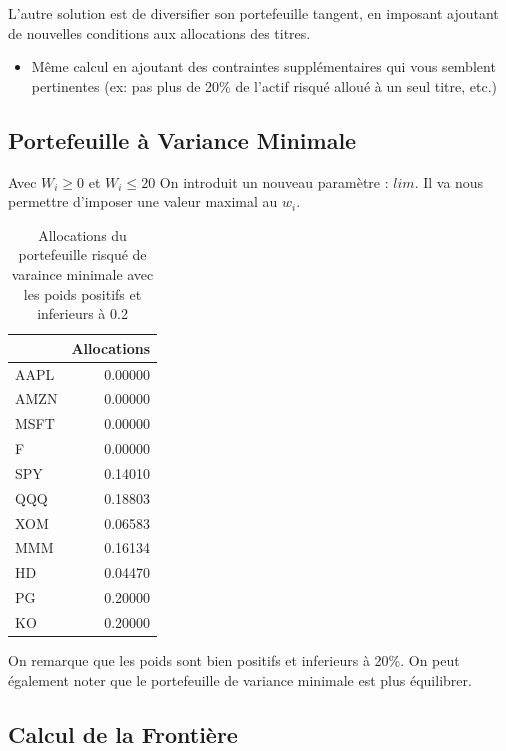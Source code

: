 \documentclass[
]{article}
\providecommand{\tightlist}{%
  \setlength{\itemsep}{0pt}\setlength{\parskip}{0pt}}
\begin{document}
L'autre solution est de diversifier son portefeuille tangent, en
imposant ajoutant de nouvelles conditions aux allocations des titres.

\begin{itemize}
\tightlist
\item
  Même calcul en ajoutant des contraintes supplémentaires qui vous
  semblent pertinentes (ex: pas plus de 20\% de l'actif risqué alloué à
  un seul titre, etc.)
\end{itemize}

\hypertarget{portefeuille-uxe0-variance-minimale-1}{%
\subsection{Portefeuille à Variance
Minimale}\label{portefeuille-uxe0-variance-minimale-1}}

Avec \(W_i\ge 0\) et \(W_i\le 20%
\) On introduit un nouveau paramètre : \(lim\). Il va nous permettre
d'imposer une valeur maximal au \(w_i\).

\begin{table}

\caption{\label{tab:unnamed-chunk-13}Allocations du portefeuille risqué de varaince minimale avec les poids positifs et inferieurs à 0.2}
\centering
\begin{tabular}[t]{lr}
\toprule
  & Allocations\\
\midrule
AAPL & 0.00000\\
AMZN & 0.00000\\
MSFT & 0.00000\\
F & 0.00000\\
SPY & 0.14010\\
\addlinespace
QQQ & 0.18803\\
XOM & 0.06583\\
MMM & 0.16134\\
HD & 0.04470\\
PG & 0.20000\\
\addlinespace
KO & 0.20000\\
\bottomrule
\end{tabular}
\end{table}

On remarque que les poids sont bien positifs et inferieurs à 20\%. On
peut également noter que le portefeuille de variance minimale est plus
équilibrer.

\hypertarget{calcul-de-la-frontiuxe8re-1}{%
\subsection{Calcul de la Frontière}\label{calcul-de-la-frontiuxe8re-1}}
\end{document}
